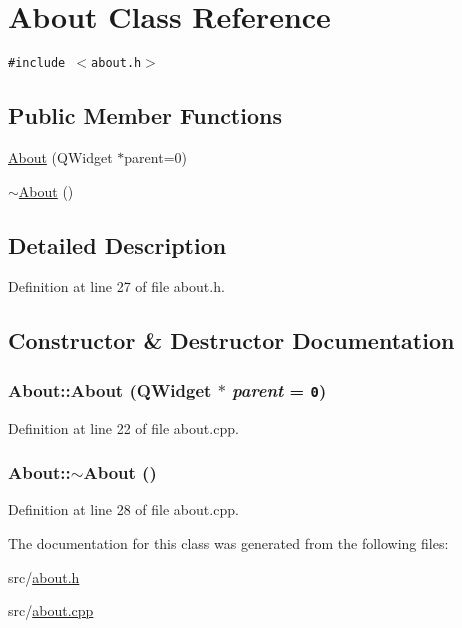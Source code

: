 \hypertarget{classAbout}{
\section{About Class Reference}
\label{classAbout}
}
{\tt \#include $<$about.h$>$}

\subsection*{Public Member Functions}
\begin{CompactItemize}
\item 
\hyperlink{classAbout_b79599ebbcdeffe0a96e00f010e64177}{About} (QWidget $\ast$parent=0)
\item 
\hyperlink{classAbout_ce60197b1b610998908036ee1f802204}{$\sim$About} ()
\end{CompactItemize}


\subsection{Detailed Description}


Definition at line 27 of file about.h.

\subsection{Constructor \& Destructor Documentation}
\hypertarget{classAbout_b79599ebbcdeffe0a96e00f010e64177}{
\subsubsection[{About}]{\setlength{\rightskip}{0pt plus 5cm}About::About (QWidget $\ast$ {\em parent} = {\tt 0})}}
\label{classAbout_b79599ebbcdeffe0a96e00f010e64177}




Definition at line 22 of file about.cpp.\hypertarget{classAbout_ce60197b1b610998908036ee1f802204}{
\subsubsection[{$\sim$About}]{\setlength{\rightskip}{0pt plus 5cm}About::$\sim$About ()}}
\label{classAbout_ce60197b1b610998908036ee1f802204}




Definition at line 28 of file about.cpp.

The documentation for this class was generated from the following files:\begin{CompactItemize}
\item 
src/\hyperlink{about_8h}{about.h}\item 
src/\hyperlink{about_8cpp}{about.cpp}\end{CompactItemize}
